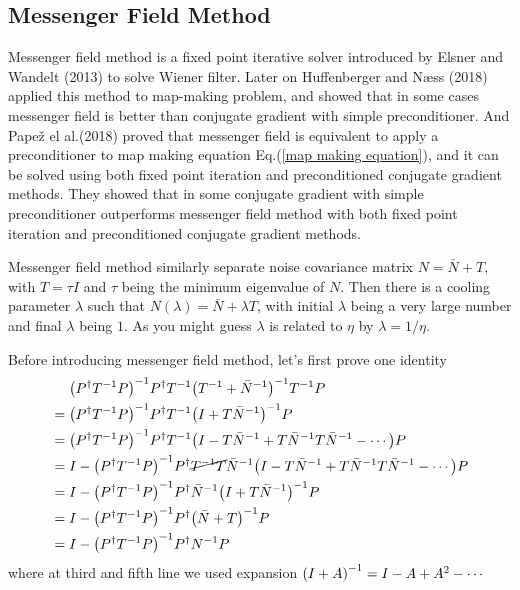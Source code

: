 \documentclass[11pt, letterpaper]{article}
\newcommand{\inv}[1]{#1^{-1}}
\newcommand{\Pdagger}{P^{\dagger}}
\newcommand{\Nbar}{\bar{N}}
\newcommand{\PPinv}[1]{\inv{\qty(\Pdagger #1 P)}}
\begin{document}
\subsection{Messenger Field Method}
Messenger field method is a fixed point iterative solver introduced by
Elsner and Wandelt (2013) \cite{2013A&A...549A.111E} to solve Wiener filter.
Later on Huffenberger and N{\ae}ss (2018) \cite{Huffenberger_2018} applied this
method to map-making problem, and showed that in some cases messenger field is
better than conjugate gradient with simple preconditioner.
And Pape\v{z} el al.(2018) \cite{2018A&A...620A..59P} proved that messenger
field is equivalent to apply a preconditioner to map making equation
Eq.(\ref{map making equation}), and it can be solved using both fixed point
iteration and preconditioned conjugate gradient methods.
They showed that in some conjugate gradient with simple preconditioner
outperforms messenger field method with both fixed point iteration and
preconditioned conjugate gradient methods.

Messenger field method similarly separate noise covariance matrix
$N = \Nbar + T$, with $T = \tau I $ and $\tau$ being the minimum eigenvalue of
$N$.
Then there is a cooling parameter $\lambda$ such that 
$N(\lambda) = \Nbar + \lambda T$, with initial $\lambda$ being a very large
number and final $\lambda$ being $1$.
As you might guess $\lambda$ is related to $\eta$ by $\lambda = 1/\eta$.

Before introducing messenger field method, let's first prove one identity
\begin{align}
\begin{aligned}[b]
&\mathrel{\phantom{=}}
\PPinv{\inv{T}} \Pdagger \inv{T} \inv{\qty(\inv{T} + \inv{\Nbar})} \inv{T} P
\\
&= \PPinv{\inv{T}} \Pdagger \inv{T} \inv{\qty(I + T\inv{\Nbar})}  P
\\
&= \PPinv{\inv{T}} \Pdagger \inv{T}
    \qty(I - T\inv{\Nbar}+ T\inv{\Nbar}T\inv{\Nbar} - \cdots) P
\\
&= I - \PPinv{\inv{T}} \Pdagger \cancel{\inv{T}T} \inv{\Nbar} 
    \qty(I - T\inv{\Nbar} + T\inv{\Nbar}T\inv{\Nbar} - \cdots)P
\\
&= I - \PPinv{\inv{T}} \Pdagger \inv{\Nbar} \inv{\qty(I + T\inv{\Nbar})} P
\\
&= I - \PPinv{\inv{T}} \Pdagger \inv{\qty(\Nbar + T)} P
\\
&= I - \PPinv{\inv{T}} \Pdagger \inv{N} P \label{MF identity}
\end{aligned}
\end{align}
where at third and fifth line we used expansion
$\inv{\qty(I + A)} = I - A + A^2 - \cdots $
\end{document}
